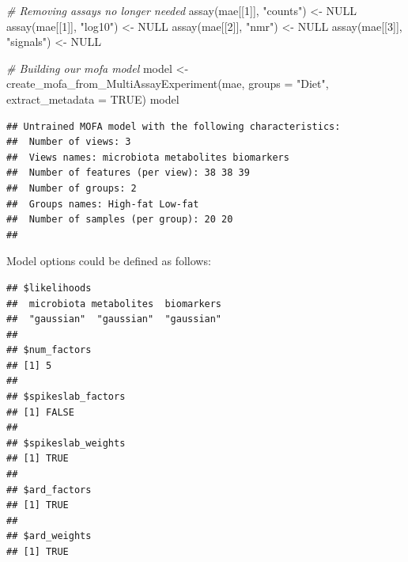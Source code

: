 \documentclass[
]{book}
\newenvironment{Shaded}{\begin{snugshade}}{\end{snugshade}}
\newcommand{\AttributeTok}[1]{\textcolor[rgb]{0.77,0.63,0.00}{#1}}
\newcommand{\CommentTok}[1]{\textcolor[rgb]{0.56,0.35,0.01}{\textit{#1}}}
\newcommand{\ConstantTok}[1]{\textcolor[rgb]{0.00,0.00,0.00}{#1}}
\newcommand{\DecValTok}[1]{\textcolor[rgb]{0.00,0.00,0.81}{#1}}
\newcommand{\FunctionTok}[1]{\textcolor[rgb]{0.00,0.00,0.00}{#1}}
\newcommand{\NormalTok}[1]{#1}
\newcommand{\OtherTok}[1]{\textcolor[rgb]{0.56,0.35,0.01}{#1}}
\newcommand{\SpecialCharTok}[1]{\textcolor[rgb]{0.00,0.00,0.00}{#1}}
\newcommand{\StringTok}[1]{\textcolor[rgb]{0.31,0.60,0.02}{#1}}
\begin{document}
\begin{Shaded}
\begin{Highlighting}[]
\CommentTok{\# Removing assays no longer needed}
\FunctionTok{assay}\NormalTok{(mae[[}\DecValTok{1}\NormalTok{]], }\StringTok{"counts"}\NormalTok{) }\OtherTok{\textless{}{-}} \ConstantTok{NULL}
\FunctionTok{assay}\NormalTok{(mae[[}\DecValTok{1}\NormalTok{]], }\StringTok{"log10"}\NormalTok{) }\OtherTok{\textless{}{-}} \ConstantTok{NULL}
\FunctionTok{assay}\NormalTok{(mae[[}\DecValTok{2}\NormalTok{]], }\StringTok{"nmr"}\NormalTok{) }\OtherTok{\textless{}{-}} \ConstantTok{NULL}
\FunctionTok{assay}\NormalTok{(mae[[}\DecValTok{3}\NormalTok{]], }\StringTok{"signals"}\NormalTok{) }\OtherTok{\textless{}{-}} \ConstantTok{NULL}

\CommentTok{\# Building our mofa model}
\NormalTok{model }\OtherTok{\textless{}{-}} \FunctionTok{create\_mofa\_from\_MultiAssayExperiment}\NormalTok{(mae,}
                                               \AttributeTok{groups =} \StringTok{"Diet"}\NormalTok{, }
                                               \AttributeTok{extract\_metadata =} \ConstantTok{TRUE}\NormalTok{)}
\NormalTok{model}
\end{Highlighting}
\end{Shaded}

\begin{verbatim}
## Untrained MOFA model with the following characteristics: 
##  Number of views: 3 
##  Views names: microbiota metabolites biomarkers 
##  Number of features (per view): 38 38 39 
##  Number of groups: 2 
##  Groups names: High-fat Low-fat 
##  Number of samples (per group): 20 20 
## 
\end{verbatim}

Model options could be defined as follows:

\begin{Shaded}
\end{Shaded}

\begin{verbatim}
## $likelihoods
##  microbiota metabolites  biomarkers 
##  "gaussian"  "gaussian"  "gaussian" 
## 
## $num_factors
## [1] 5
## 
## $spikeslab_factors
## [1] FALSE
## 
## $spikeslab_weights
## [1] TRUE
## 
## $ard_factors
## [1] TRUE
## 
## $ard_weights
## [1] TRUE
\end{verbatim}
\end{document}
